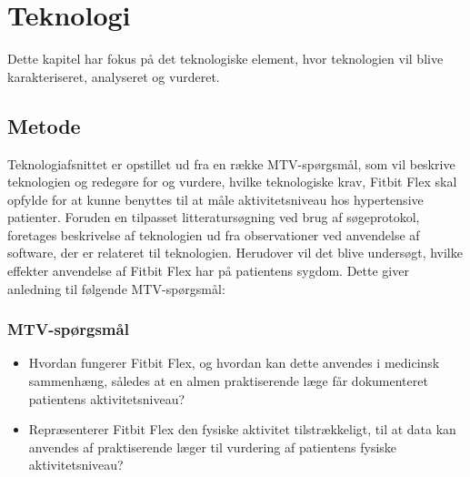 \chapter{Teknologi}
Dette kapitel har fokus på det teknologiske element, hvor teknologien vil blive karakteriseret, analyseret og vurderet.
\section{Metode}
Teknologiafsnittet er opstillet ud fra en række MTV-spørgsmål, som vil beskrive teknologien og redegøre for og vurdere, hvilke teknologiske krav, Fitbit Flex skal opfylde for at kunne benyttes til at måle aktivitetsniveau hos hypertensive patienter. 
 Foruden en tilpasset litteratursøgning ved brug af søgeprotokol, foretages beskrivelse af teknologien ud fra observationer ved anvendelse af software, der er relateret til teknologien.   
Herudover vil det blive undersøgt, hvilke effekter anvendelse af Fitbit Flex har på patientens sygdom. 
Dette giver anledning til følgende MTV-spørgsmål: 
\subsection{MTV-spørgsmål}
\begin{itemize}
\item Hvordan fungerer Fitbit Flex, og hvordan kan dette anvendes i medicinsk sammenhæng, således at en almen praktiserende læge får dokumenteret patientens aktivitetsniveau?
\item Repræsenterer Fitbit Flex den fysiske aktivitet tilstrækkeligt, til at data kan anvendes af praktiserende læger til vurdering af patientens fysiske aktivitetsniveau?
\end{itemize}








